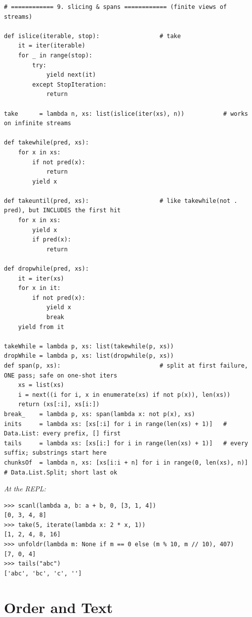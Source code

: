 \documentclass[11pt,letterpaper]{book}
\begin{document}
\begin{lstlisting}[style=code]
# ============ 9. slicing & spans ============ (finite views of streams)

def islice(iterable, stop):                 # take
    it = iter(iterable)
    for _ in range(stop):
        try:
            yield next(it)
        except StopIteration:
            return

take      = lambda n, xs: list(islice(iter(xs), n))           # works on infinite streams

def takewhile(pred, xs):
    for x in xs:
        if not pred(x):
            return
        yield x

def takeuntil(pred, xs):                    # like takewhile(not . pred), but INCLUDES the first hit
    for x in xs:
        yield x
        if pred(x):
            return

def dropwhile(pred, xs):
    it = iter(xs)
    for x in it:
        if not pred(x):
            yield x
            break
    yield from it

takeWhile = lambda p, xs: list(takewhile(p, xs))
dropWhile = lambda p, xs: list(dropwhile(p, xs))
def span(p, xs):                            # split at first failure, ONE pass; safe on one-shot iters
    xs = list(xs)
    i = next((i for i, x in enumerate(xs) if not p(x)), len(xs))
    return (xs[:i], xs[i:])
break_    = lambda p, xs: span(lambda x: not p(x), xs)
inits     = lambda xs: [xs[:i] for i in range(len(xs) + 1)]   # Data.List: every prefix, [] first
tails     = lambda xs: [xs[i:] for i in range(len(xs) + 1)]   # every suffix; substrings start here
chunksOf  = lambda n, xs: [xs[i:i + n] for i in range(0, len(xs), n)]   # Data.List.Split; short last ok
\end{lstlisting}

\noindent\textit{At the REPL:}
\begin{lstlisting}[style=spec]
>>> scanl(lambda a, b: a + b, 0, [3, 1, 4])
[0, 3, 4, 8]
>>> take(5, iterate(lambda x: 2 * x, 1))
[1, 2, 4, 8, 16]
>>> unfoldr(lambda m: None if m == 0 else (m % 10, m // 10), 407)
[7, 0, 4]
>>> tails("abc")
['abc', 'bc', 'c', '']
\end{lstlisting}
\chapter{Order and Text}
\end{document}
